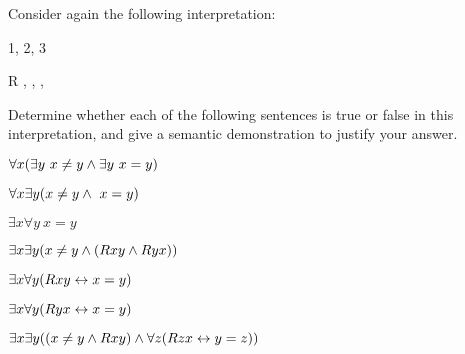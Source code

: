 \practiceproblems

\problempart Consider again the following interpretation:

\begin{multicols}{2}
	\begin{ekey}
		\item[\text{Domain}] 1, 2, 3
		\item[R] , , ,  
	\end{ekey}
\columnbreak


\end{multicols}


\noindent Determine whether each of the following sentences is true or false in this interpretation, and give a semantic demonstration to justify your answer.
\begin{earg}
\item $\forall x (\exists y \ x \neq y \wedge \exists y \ x = y)$
\item $\forall x \exists y ( x \neq y \wedge \ x = y)$
\item $\exists x \forall y \ x = y$
\item $\exists x \exists y (x \neq y \wedge  (Rxy \wedge Ryx))$
\item $\exists x \forall y(Rxy \leftrightarrow x = y)$
\item $\exists x \forall y(Ryx \leftrightarrow x = y)$
\item $\exists x \exists y((x \neq y \wedge Rxy) \wedge \forall z(Rzx \leftrightarrow y = z))$
\end{earg}


